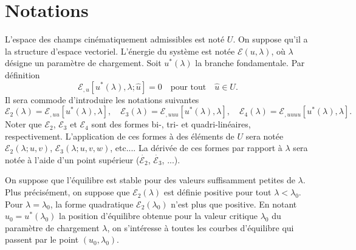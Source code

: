 \documentclass[12pt, final]{amsart}
\begin{document}
\title{\sbtitle}
\author{\sbauthor}
\address{\sbaddress}

\begin{abstract}
  blabla
\end{abstract}

\maketitle

\section{Notations}

L'espace des champs cinématiquement admissibles est noté $U$. On
suppose qu'il a la structure d'espace vectoriel. L'énergie du syst{\`e}me
est notée $\mathcal{E} (u, \lambda)$, o{\`u} $\lambda$ désigne un
param{\`e}tre de chargement. Soit $u^{\ast} (\lambda)$ la branche
fondamentale. Par définition
\begin{equation}
  \mathcal{E}_{, u} [u^{\ast} (\lambda), \lambda ; \hat{u}] = 0 \quad
  \text{pour tout} \quad \hat{u} \in U.
\end{equation}
Il sera commode d'introduire les notations suivantes
\begin{equation}
  \mathcal{E}_2 (\lambda) =\mathcal{E}_{, u  u}  [u^{\ast} (\lambda),
  \lambda], \quad \mathcal{E}_3 (\lambda) =\mathcal{E}_{, u  u
   u} [u^{\ast} (\lambda), \lambda], \quad \mathcal{E}_4 (\lambda)
  =\mathcal{E}_{, u  u  u  u} [u^{\ast} (\lambda),
  \lambda] .
\end{equation}
Noter que $\mathcal{E}_2$, $\mathcal{E}_3$ et $\mathcal{E}_4$ sont des formes
bi-, tri- et quadri-linéaires, respectivement. L'application de ces formes
{\`a} des éléments de $U$ sera notée $\mathcal{E}_2 (\lambda ; u,
v)$, $\mathcal{E}_3 (\lambda ; u, v, w)$, etc.... La dérivée de ces
formes par rapport {\`a} $\lambda$ sera notée {\`a} l'aide d'un point
supérieur ($\dot{\mathcal{E}_2}$, $\dot{\mathcal{E}_3}$, ...).

On suppose que l'équilibre est stable pour des valeurs suffisamment
petites de $\lambda$. Plus précisément, on suppose que $\mathcal{E}_2
(\lambda)$ est définie positive pour tout $\lambda < \lambda_0$. Pour
$\lambda = \lambda_0$, la forme quadratique $\mathcal{E}_2 (\lambda_0)$ n'est
plus que positive. En notant $u_0 = u^{\ast} (\lambda_0)$ la position
d'équilibre obtenue pour la valeur critique $\lambda_0$ du param{\`e}tre
de chargement $\lambda$, on s'intéresse {\`a} toutes les courbes
d'équilibre qui passent par le point $(u_0, \lambda_0)$.
\end{document}
